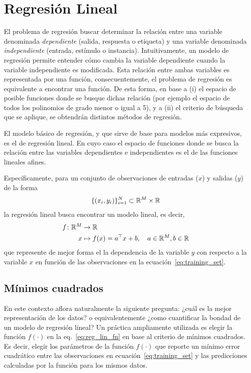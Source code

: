 
\section{Regresión Lineal}

El problema de regresión buscar determinar la relación entre una variable denominada \emph{dependiente} (salida, respuesta o etiqueta) y una variable denominada \emph{independiente} (entrada, estímulo o instancia). Intuitivamente, un modelo de regresión permite entender cómo cambia la variable dependiente cuando la variable independiente es modificada. Esta relación entre ambas variables es representada por una función, consecuentemente, el problema de regresión es equivalente a encontrar una función. De esta forma, en base a (i) el espacio de posible funciones donde se busque dichas relación (por ejemplo el espacio de todos los polinomios de grado menor o igual a 5), y a (ii) el criterio de búsqueda que se aplique, se obtendrán distintos métodos de regresión. 

El modelo básico de regresión, y que sirve de base para modelos más expresivos, es el de regresión lineal. En cuyo caso el espacio de funciones donde se busca la relación entre las variables dependientes e independientes es el de las funciones lineales afines. 

Específicamente, para un conjunto de observaciones de entradas ($x$) y salidas ($y$) de la forma
\begin{equation}
	\{(x_i,y_i)\}_{i=1}^N\subset {\mathbb R}^M \times {\mathbb R}
	\label{eq:training_set}
\end{equation}
la regresión lineal busca encontrar un modelo lineal, es decir,  
\begin{align}
  f \colon {\mathbb R}^M &\to {\mathbb R}\nonumber\\
  x &\mapsto f(x)=a^\top x + b,\quad a\in{\mathbb R}^M,b\in{\mathbb R}
 \label{eq:reg_lin_fn} 
\end{align}
que represente de mejor forma el la dependencia de la variable $y$ con respecto a la variable $x$ en función de las observaciones en la ecuación~\eqref{eq:training_set}.



\subsection{Mínimos cuadrados} %
\label{ssub:min_cuad}
En este contexto aflora naturalmente la siguiente pregunta: ¿cuál es la mejor representación de los datos? o equivalentemente ¿como cuantificar la bondad de un modelo de regresión lineal? Un práctica  ampliamente utilizada es elegir la función $f(\cdot)$ en la eq.~\eqref{eq:reg_lin_fn} en base al criterio de mínimos cuadrados. Es decir, elegir los parámetros de la función $f(\cdot)$ que reporte un mínimo error cuadrático entre las observaciones en ecuación~\eqref{eq:training_set} y las predicciones calculadas por la función para los mismos datos. 

